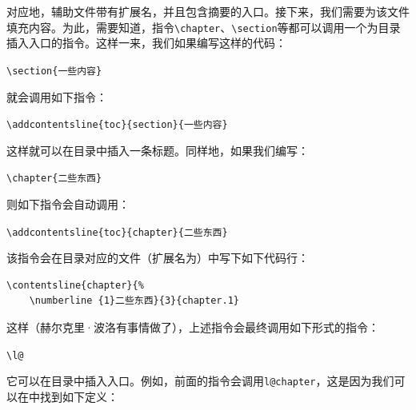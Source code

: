 对应地，辅助文件带有扩展名，并且包含摘要的入口。接下来，我们需要为该文件填充内容。为此，需要知道，指令\verb|\chapter|、\verb|\section|等都可以调用一个为目录插入入口的指令。这样一来，我们如果编写这样的代码：

\begin{dmd}
\verb|\section{一些内容}|
\end{dmd}

就会调用如下指令：

\begin{dmd}
\verb|\addcontentsline{toc}{section}{一些内容}|
\end{dmd}

这样就可以在目录中插入一条标题。同样地，如果我们编写：

\begin{dmd}
\verb+\chapter{二些东西}+
\end{dmd}

则如下指令会自动调用：

\begin{dmd}
\verb|\addcontentsline{toc}{chapter}{二些东西}|
\end{dmd}

该指令会在目录对应的文件（扩展名为）中写下如下代码行：

\begin{dmd}
\begin{verbatim}
\contentsline{chapter}{%
    \numberline {1}二些东西}{3}{chapter.1}
\end{verbatim}
\end{dmd}

这样（赫尔克里·波洛有事情做了），上述指令会最终调用如下形式的指令：

\begin{dmd}
\verb+\l@+
\end{dmd}

它可以在目录中插入入口。例如，前面的指令会调用\verb|l@chapter|，这是因为我们可以在中找到如下定义：

